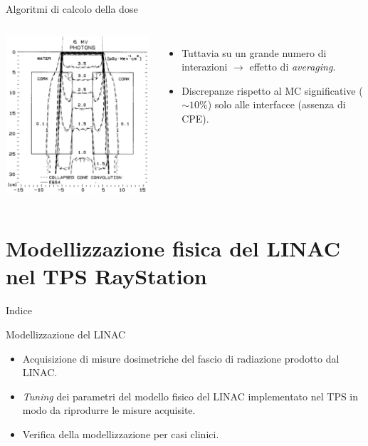 \documentclass{beamer}
\begin{document}
\begin{frame}{Algoritmi di calcolo della dose}
\begin{columns}[t]
\includegraphics[width=\textwidth]{../cap1/kern_dens2_pres.png}
\scriptsize
\begin{itemize}
\item Tuttavia su un grande numero di interazioni $\rightarrow$ effetto di \textit{averaging}.
\item Discrepanze rispetto al MC significative ($\sim 10\%$) solo alle interfacce (assenza di CPE).
\end{itemize}
\end{columns}
\end{frame}



\section[Modellizzazione del LINAC]{Modellizzazione fisica del LINAC nel TPS RayStation}
\begin{frame}{Indice}
\tableofcontents[currentsection]
\end{frame}

\begin{frame}{Modellizzazione del LINAC}
\small
{}
\begin{itemize}
\item Acquisizione di misure dosimetriche del fascio di radiazione prodotto dal LINAC.
\item \textit{Tuning} dei parametri del modello fisico del LINAC implementato nel TPS in modo da riprodurre le misure acquisite.
\item Verifica della modellizzazione per casi clinici.
\end{itemize}
\end{frame}
\end{document}
